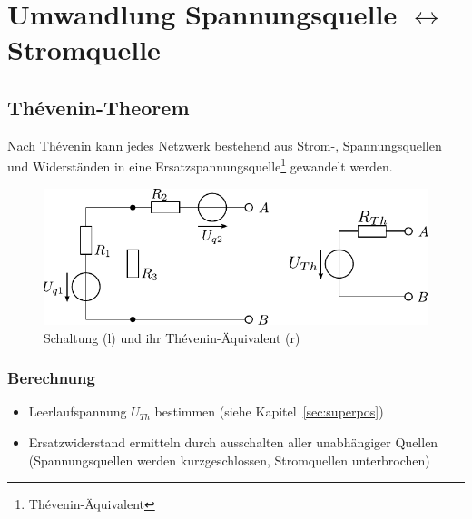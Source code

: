 



\section{Umwandlung Spannungsquelle $\leftrightarrow$ Stromquelle}

\subsection{Thévenin-Theorem}
Nach Thévenin kann jedes Netzwerk bestehend aus Strom-, Spannungsquellen und Widerständen in eine Ersatzspannungsquelle\footnote{Thévenin-Äquivalent} gewandelt werden.

\begin{figure}[h!]
\centering
\includegraphics[scale=\schscale]{thevenin_sch_2.pdf}
\caption{Schaltung (l) und ihr Thévenin-Äquivalent (r)}
\label{sch:thevenin}
\end{figure}

\subsubsection{Berechnung}
\begin{itemize}
\item Leerlaufspannung $U_{Th}$ bestimmen (siehe Kapitel~\ref{sec:superpos})
\item Ersatzwiderstand ermitteln durch ausschalten aller unabhängiger Quellen (Spannungsquellen werden kurzgeschlossen, Stromquellen unterbrochen)
\end{itemize}

